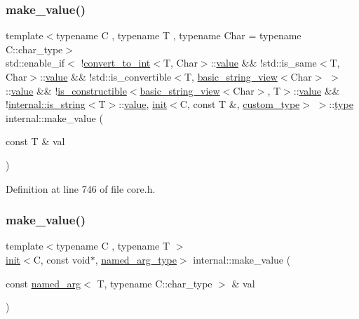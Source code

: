 \subsubsection{\texorpdfstring{make\+\_\+value()}{make\_value()}\hspace{0.1cm}{\footnotesize\ttfamily [6/8]}}
{\footnotesize\ttfamily template$<$typename C , typename T , typename Char  = typename C\+::char\+\_\+type$>$ \\
std\+::enable\+\_\+if$<$ !\hyperlink{structconvert__to__int}{convert\+\_\+to\+\_\+int}$<$T, Char$>$\+::\hyperlink{classinternal_1_1value}{value} \&\& !std\+::is\+\_\+same$<$T, Char$>$\+::\hyperlink{classinternal_1_1value}{value} \&\& !std\+::is\+\_\+convertible$<$T, \hyperlink{classbasic__string__view}{basic\+\_\+string\+\_\+view}$<$Char$>$ $>$\+::\hyperlink{classinternal_1_1value}{value} \&\& !\hyperlink{structis__constructible}{is\+\_\+constructible}$<$\hyperlink{classbasic__string__view}{basic\+\_\+string\+\_\+view}$<$Char$>$, T$>$\+::\hyperlink{classinternal_1_1value}{value} \&\& !\hyperlink{structinternal_1_1is__string}{internal\+::is\+\_\+string}$<$T$>$\+::\hyperlink{classinternal_1_1value}{value}, \hyperlink{structinternal_1_1init}{init}$<$C, const T \&, \hyperlink{namespaceinternal_a8661864098ac0acff9a6dd7e66f59038a7f81f24620187ebe99e60e9e42ab9b15}{custom\+\_\+type}$>$ $>$\+::\hyperlink{namespaceinternal_a8661864098ac0acff9a6dd7e66f59038}{type} internal\+::make\+\_\+value (\begin{DoxyParamCaption}\item[{const T \&}]{val }\end{DoxyParamCaption})\hspace{0.3cm}{\ttfamily [inline]}}



Definition at line 746 of file core.\+h.

\mbox{\label{namespaceinternal_a79837815bee11b56f801442c7e5b2742}} 
\subsubsection{\texorpdfstring{make\+\_\+value()}{make\_value()}\hspace{0.1cm}{\footnotesize\ttfamily [7/8]}}
{\footnotesize\ttfamily template$<$typename C , typename T $>$ \\
\hyperlink{structinternal_1_1init}{init}$<$C, const void$\ast$, \hyperlink{namespaceinternal_a8661864098ac0acff9a6dd7e66f59038a13dabc37bdc511ad896d2524ef1779d4}{named\+\_\+arg\+\_\+type}$>$ internal\+::make\+\_\+value (\begin{DoxyParamCaption}\item[{const \hyperlink{structinternal_1_1named__arg}{named\+\_\+arg}$<$ T, typename C\+::char\+\_\+type $>$ \&}]{val }\end{DoxyParamCaption})}



